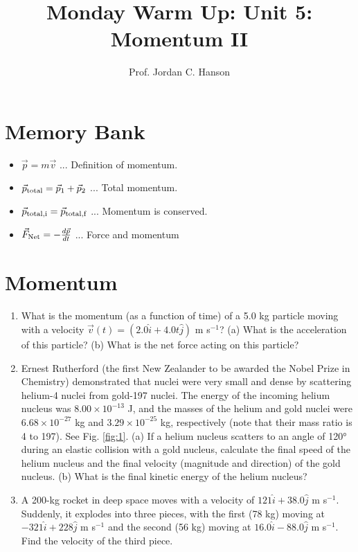 \documentclass{article}
\begin{document}
\twocolumn

\title{Monday Warm Up: Unit 5: Momentum II}
\author{Prof. Jordan C. Hanson}

\maketitle

\section{Memory Bank}

\begin{itemize}
\item $\vec{p} = m\vec{v}$ ... Definition of momentum.
\item $\vec{p}_{\rm total} = \vec{p}_1 + \vec{p}_2$ ... Total momentum.
\item $\vec{p}_{\rm total,i} = \vec{p}_{\rm total,f}$ ... Momentum is conserved.
\item $\vec{F}_{\rm Net} = -\frac{d\vec{p}}{dt}$ ... Force and momentum
\end{itemize}

\section{Momentum}

\begin{enumerate}
\item What is the momentum (as a function of time) of a 5.0 kg particle moving with a velocity $\vec{v}(t)=(2.0\hat{i}+4.0t\hat{j})$ m s$^{-1}$? (a) What is the acceleration of this particle? (b) What is the net force acting on this particle? \\ \vspace{3cm}
\item Ernest Rutherford (the first New Zealander to be awarded the Nobel Prize in Chemistry) demonstrated that nuclei were very small and dense by scattering helium-4 nuclei from gold-197 nuclei. The energy of the incoming helium nucleus was $8.00\times 10^{−13}$ J, and the masses of the helium and gold nuclei were $6.68\times 10^{−27}$ kg and $3.29\times 10^{−25}$ kg, respectively (note that their mass ratio is 4 to 197). See Fig. \ref{fig:1}.  (a) If a helium nucleus scatters to an angle of 120° during an elastic collision with a gold nucleus, calculate the final speed of the helium nucleus and the final velocity (magnitude and direction) of the gold nucleus.  (b) What is the final kinetic energy of the helium nucleus? \\ \vspace{5cm}
\item A 200-kg rocket in deep space moves with a velocity of $121\hat{i}+38.0\hat{j}$ m s$^{-1}$. Suddenly, it explodes into three pieces, with the first (78 kg) moving at $−321\hat{i}+228\hat{j}$ m s$^{-1}$ and the second (56 kg) moving at $16.0\hat{i} - 88.0\hat{j}$ m s$^{-1}$. Find the velocity of the third piece.
\end{enumerate}
\end{document}

